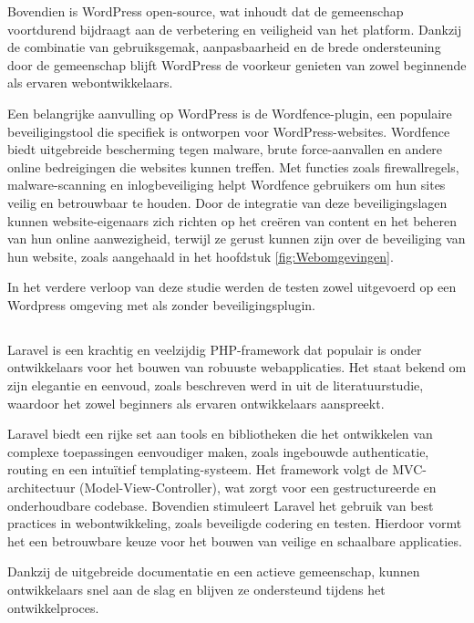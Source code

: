 Bovendien is WordPress open-source, wat inhoudt dat de 
gemeenschap voortdurend bijdraagt aan de verbetering en veiligheid van het platform. Dankzij de combinatie van gebruiksgemak, 
aanpasbaarheid en de brede ondersteuning door de gemeenschap blijft WordPress de voorkeur genieten van zowel beginnende als 
ervaren webontwikkelaars.

Een belangrijke aanvulling op WordPress is de Wordfence-plugin, een populaire beveiligingstool die specifiek is ontworpen 
voor WordPress-websites. Wordfence biedt uitgebreide bescherming tegen malware, brute force-aanvallen en andere online 
bedreigingen die websites kunnen treffen. Met functies zoals firewallregels, malware-scanning en inlogbeveiliging helpt 
Wordfence gebruikers om hun sites veilig en betrouwbaar te houden. Door de integratie van deze beveiligingslagen kunnen 
website-eigenaars zich richten op het creëren van content en het beheren van hun online aanwezigheid, terwijl ze gerust 
kunnen zijn over de beveiliging van hun website, zoals aangehaald in het hoofdstuk \ref{fig:Webomgevingen}.

In het verdere verloop van deze studie werden de testen zowel uitgevoerd op een Wordpress omgeving met als zonder 
beveiligingsplugin.

\subsection{}
Laravel is een krachtig en veelzijdig PHP-framework dat populair is onder ontwikkelaars voor het bouwen van robuuste 
webapplicaties. Het staat bekend om zijn elegantie en eenvoud, zoals beschreven werd in  
uit de literatuurstudie, waardoor het zowel beginners als ervaren ontwikkelaars aanspreekt. 

Laravel biedt een rijke set aan tools en bibliotheken die het ontwikkelen van complexe toepassingen eenvoudiger 
maken, zoals ingebouwde authenticatie, routing en een intuïtief templating-systeem. Het framework volgt de MVC-architectuur 
(Model-View-Controller), wat zorgt voor een gestructureerde en onderhoudbare codebase. Bovendien stimuleert Laravel het 
gebruik van best practices in webontwikkeling, zoals beveiligde codering en testen. Hierdoor vormt het een betrouwbare keuze 
voor het bouwen van veilige en schaalbare applicaties. 

Dankzij de uitgebreide documentatie en een actieve gemeenschap, kunnen 
ontwikkelaars snel aan de slag en blijven ze ondersteund tijdens het ontwikkelproces.

